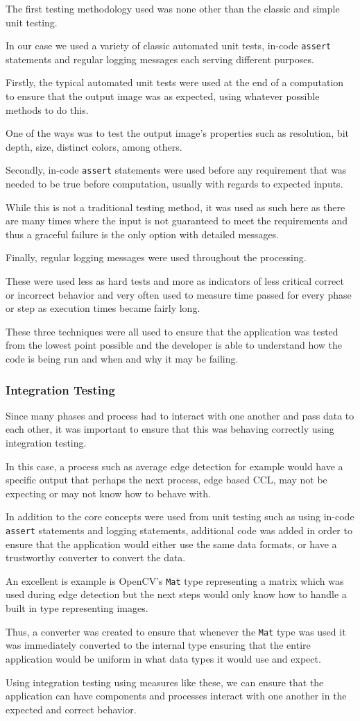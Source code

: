 \documentclass[12pt]{article}
\newcommand{\sentence}{} %
\newcommand{\code}[1]{\texttt{#1}}
\begin{document}
    \tab
    The first testing methodology used was none other than the classic and simple unit testing.
    \sentence
    In our case we used a variety of classic automated unit tests, in-code \code{assert} statements and regular
    logging messages each serving different purposes.
    \sentence
    Firstly, the typical automated unit tests were used at the end of a computation to ensure that the output image
    was as expected, using whatever possible methods to do this.
    \sentence
    One of the ways was to test the output image's properties such as resolution, bit depth, size, distinct colors,
    among others.
    \sentence
    Secondly, in-code \code{assert} statements were used before any requirement that was needed to be true before
    computation, usually with regards to expected inputs.
    \sentence
    While this is not a traditional testing method, it was used as such here as there are many times where the input
    is not guaranteed to meet the requirements and thus a graceful failure is the only option with detailed messages.
    \sentence
    Finally, regular logging messages were used throughout the processing.
    \sentence
    These were used less as hard tests and more as indicators of less critical correct or incorrect behavior and very
    often used to measure time passed for every phase or step as execution times became fairly long.
    \sentence
    These three techniques were all used to ensure that the application was tested from the lowest point possible and
    the developer is able to understand how the code is being run and when and why it may be failing.

    \subsubsection{Integration Testing}\label{subsubsec:integration-testing}

    \tab
    Since many phases and process had to interact with one another and pass data to each other, it was important to
    ensure that this was behaving correctly using integration testing.
    \sentence
    In this case, a process such as average edge detection for example would have a specific output that perhaps the
    next process, edge based CCL, may not be expecting or may not know how to behave with.
    \sentence
    In addition to the core concepts were used from unit testing such as using in-code \code{assert} statements
    and logging statements, additional code was added in order to ensure that the application would either use the
    same data formats, or have a trustworthy converter to convert the data.
    \sentence
    An excellent is example is OpenCV's \code{Mat} type representing a matrix which was used during edge detection
    but the next steps would only know how to handle a built in type representing images.
    \sentence
    Thus, a converter was created to ensure that whenever the \code{Mat} type was used it was immediately converted
    to the internal type ensuring that the entire application would be uniform in what data types it would use and
    expect.
    \sentence
    Using integration testing using measures like these, we can ensure that the application can have components and
    processes interact with one another in the expected and correct behavior.
\end{document}
